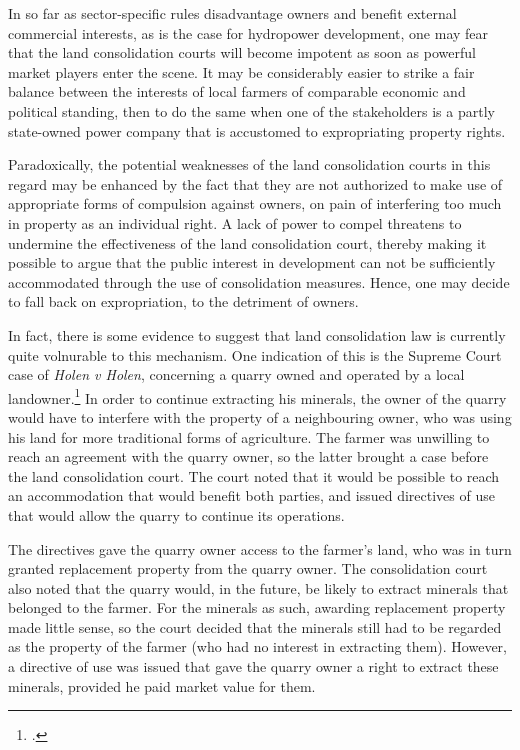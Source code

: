 In so far as sector-specific rules disadvantage owners and benefit external commercial interests, as is the case for hydropower development, one may fear that the land consolidation courts will become impotent as soon as powerful market players enter the scene. It may be considerably easier to strike a fair balance between the interests of local farmers of comparable economic and political standing, then to do the same when one of the stakeholders is a partly state-owned power company that is accustomed to expropriating property rights.

Paradoxically, the potential weaknesses of the land consolidation courts in this regard may be enhanced by the fact that they are not authorized to make use of appropriate forms of compulsion against owners, on pain of interfering too much in property as an individual right. A lack of power to compel threatens to undermine the effectiveness of the land consolidation court, thereby making it possible to argue that the public interest in development can not be sufficiently accommodated through the use of consolidation measures. Hence, one may decide to fall back on expropriation, to the detriment of owners.

In fact, there is some evidence to suggest that land consolidation law is currently quite volnurable  to this mechanism. One indication of this is the Supreme Court case of 
{\it Holen v Holen}, concerning a quarry owned and operated by a local landowner.\footcite{holen95} In order to continue extracting his minerals, the owner of the quarry would have to interfere with the property of a neighbouring owner, who was using his land for more traditional forms of agriculture. The farmer was unwilling to reach an agreement with the quarry owner, so the latter brought a case before the land consolidation court. The court noted that it would be possible to reach an accommodation that would benefit both parties, and issued directives of use that would allow the quarry to continue its operations.

The directives gave the quarry owner access to the farmer's land, who was in turn granted replacement property from the quarry owner. The consolidation court also noted that the quarry would, in the future, be likely to extract minerals that belonged to the farmer. For the minerals as such, awarding replacement property made little sense, so the court decided that the minerals still had to be regarded as the property of the farmer (who had no interest in extracting them). However, a directive of use was issued that gave the quarry owner a right to extract these minerals, provided he paid market value for them. 

